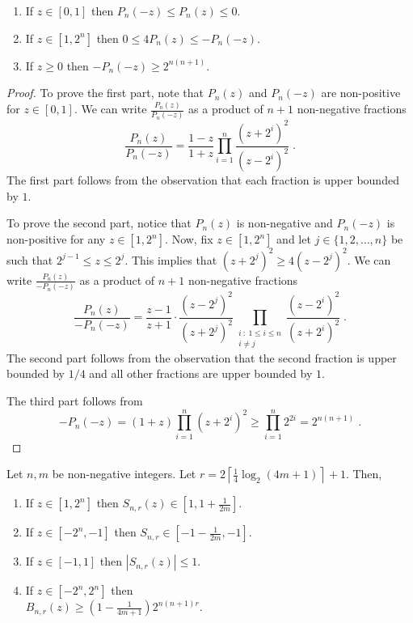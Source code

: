 \begin{lemma}[Properties of $P_n$]
\label{lemma:properties-of-p-n}
\hspace{1cm} %
\begin{enumerate}
\item If $z \in [0,1]$ then $P_n(-z) \le P_n(z) \le 0$.
\item If $z \in [1,2^n]$ then $0 \le 4P_n(z) \le -P_n(-z)$.
\item If $z \ge 0$ then $-P_n(-z) \ge 2^{n(n+1)}$.
\end{enumerate}
\end{lemma}

\begin{proof}
To prove the first part, note that $P_n(z)$ and $P_n(-z)$ are non-positive for
$z \in [0,1]$. We can write $\frac{P_n(z)}{P_n(-z)}$ as a product of $n+1$
non-negative fractions
$$
\frac{P_n(z)}{P_n(-z)} = \frac{1-z}{1+z} \prod_{i=1}^n \frac{(z+2^i)^2}{(z-2^i)^2} \; .
$$
The first part follows from the observation that each fraction is upper bounded
by $1$.

To prove the second part, notice that $P_n(z)$ is non-negative and $P_n(-z)$ is
non-positive for any $z \in [1,2^n]$. Now, fix $z \in [1,2^n]$ and let $j \in
\{1,2,\dots,n\}$ be such that $2^{j-1} \le z \le 2^j$. This implies that
$(z+2^{j})^2 \ge 4 (z - 2^j)^2$. We can write $\frac{P_n(z)}{-P_n(-z)}$ as a
product of $n+1$ non-negative fractions
$$
\frac{P_n(z)}{-P_n(-z)}
= \frac{z-1}{z+1} \cdot \frac{(z-2^j)^2}{(z+2^j)^2} \prod_{\substack{i ~:~ 1 \le i \le n \\ i \neq j}} \frac{(z-2^i)^2}{(z+2^i)^2} \; .
$$
The second part follows from the observation that the second fraction is upper
bounded by $1/4$ and all other fractions are upper bounded by $1$.

The third part follows from
$$
-P_n(-z) = (1+z) \prod_{i=1}^n (z+2^i)^2 \ge \prod_{i=1}^n 2^{2i} = 2^{n(n+1)} \; .
$$
\end{proof}

\begin{lemma}
\label{lemma:properties-of-s-n-r}
Let $n,m$ be non-negative integers.
Let $r = 2 \left\lceil \frac{1}{4} \log_2(4m + 1) \right\rceil + 1$. Then,
\begin{enumerate}
\item If $z \in [1,2^n]$ then $S_{n,r}(z) \in [1,1+\frac{1}{2m}]$.
\item If $z \in [-2^n, -1]$ then $S_{n,r} \in [-1-\frac{1}{2m}, -1]$.
\item If $z \in [-1,1]$ then $|S_{n,r}(z)| \le 1$.
\item If $z \in [-2^n,2^n]$ then \\ $B_{n,r}(z) \ge \left(1 - \frac{1}{4m+1} \right) 2^{n(n+1)r}$.
\end{enumerate}
\end{lemma}

